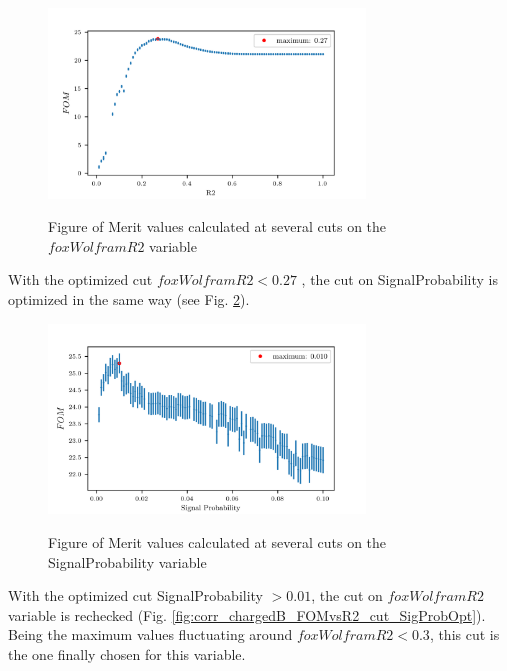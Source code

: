 \begin{figure}[h!]
{\includegraphics[width=0.75\textwidth]{04-chargedCorrBtoLambda/figs/corr_chargedB_FOMvsR2_cut.png}}
\caption{Figure of Merit values calculated at several cuts on the $foxWolframR2$ variable}
\label{fig:corr_chargedB_FOMvsR2_cut}
\end{figure}

With the optimized cut $foxWolframR2 < 0.27$ , the cut on SignalProbability is optimized in the same way (see Fig. \ref{fig:corr_chargedB_FOMvsSigProb_cut}).


\begin{figure}[h!]
{\includegraphics[width=0.75\textwidth]{04-chargedCorrBtoLambda/figs/corr_chargedB_FOMvsSigProb_cut.png}}
\caption{Figure of Merit values calculated at several cuts on the SignalProbability variable}
\label{fig:corr_chargedB_FOMvsSigProb_cut}
\end{figure}

With the optimized cut SignalProbability $ > 0.01$, the cut on $foxWolframR2$ variable is rechecked (Fig. \ref{fig:corr_chargedB_FOMvsR2_cut_SigProbOpt}). Being the maximum values fluctuating around $foxWolframR2 < 0.3$, this cut is the one finally chosen for this variable.   


